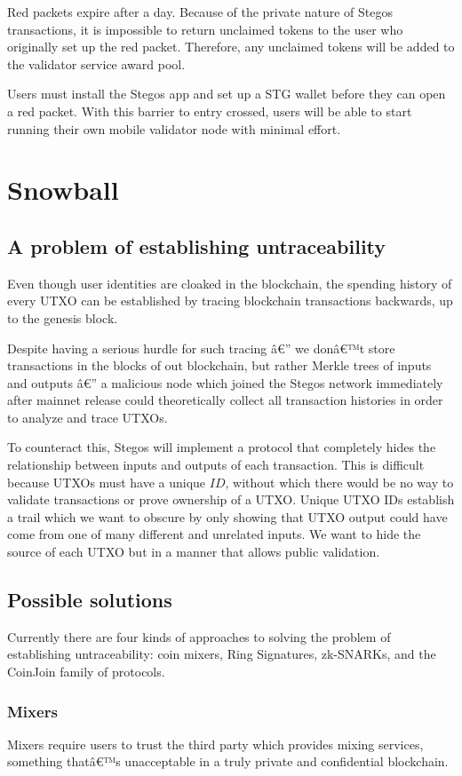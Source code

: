 \documentclass[8pt,fleqn,openany]{book}
\begin{document}
	Red packets expire after a day.  Because of the private nature of Stegos transactions, it is impossible to return unclaimed tokens to the user who originally set up the red packet. Therefore, any unclaimed tokens will be added to the validator service award pool.
	
	Users must install the Stegos app and set up a STG wallet before they can open a red packet. With this barrier to entry crossed, users will be able to start running their own mobile validator node with minimal effort.
	
	\section{Snowball}
	\subsection{A problem of establishing untraceability}
	Even though user identities are cloaked in the blockchain, the spending history of every UTXO can be established by tracing blockchain transactions backwards, up to the genesis block.
	
	Despite having a serious hurdle for such tracing â€” we donâ€™t store transactions in the blocks of out blockchain, but rather Merkle trees of inputs and outputs â€” a malicious node which joined the Stegos network immediately after mainnet release could theoretically collect all transaction histories in order to analyze and trace UTXOs.
	
	To counteract this, Stegos will implement a protocol that completely hides the relationship between inputs and outputs of each transaction. This is difficult because UTXOs must have a unique $ID$, without which there would be no way to validate transactions or prove ownership of a UTXO. Unique UTXO IDs establish a trail which we want to obscure by only showing that UTXO output could have come from one of many different and unrelated inputs. We want to hide the source of each UTXO but in a manner that allows public validation.
	
	\subsection{Possible solutions}
	Currently there are four kinds of approaches to solving the problem of establishing untraceability: coin mixers, Ring Signatures, zk-SNARKs, and the CoinJoin family of protocols.
	
	\subsubsection{Mixers} Mixers require users to trust the third party which provides mixing services, something thatâ€™s unacceptable in a truly private and confidential blockchain.
	
\end{document}
